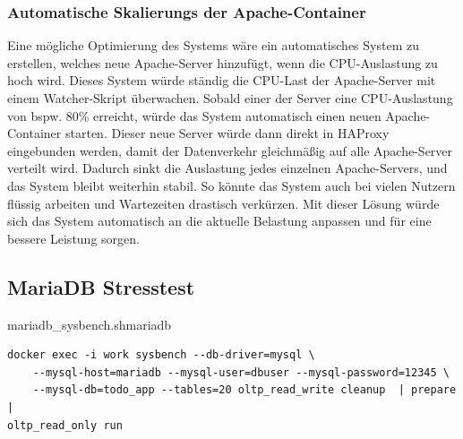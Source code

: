 \subsubsection{Automatische Skalierungs der Apache-Container}

Eine mögliche Optimierung des Systems wäre ein automatisches System zu erstellen, welches neue Apache-Server hinzufügt, wenn die CPU-Auslastung zu hoch wird. Dieses System würde ständig die CPU-Last der Apache-Server mit einem Watcher-Skript überwachen. Sobald einer der Server eine CPU-Auslastung von bspw. 80\% erreicht, würde das System automatisch einen neuen Apache-Container starten. Dieser neue Server würde dann direkt in HAProxy eingebunden werden, damit der Datenverkehr gleichmäßig auf alle Apache-Server verteilt wird. Dadurch sinkt die Auslastung jedes einzelnen Apache-Servers, und das System bleibt weiterhin stabil. So könnte das System auch bei vielen Nutzern flüssig arbeiten und Wartezeiten drastisch verkürzen. Mit dieser Lösung würde sich das System automatisch an die aktuelle Belastung anpassen und für eine bessere Leistung sorgen.


\subsection{MariaDB Stresstest}
\begin{code}{mariadb\_sysbench.sh}{mariadb}
        \begin{verbatim}
docker exec -i work sysbench --db-driver=mysql \
    --mysql-host=mariadb --mysql-user=dbuser --mysql-password=12345 \
    --mysql-db=todo_app --tables=20 oltp_read_write cleanup  | prepare | 
oltp_read_only run
        \end{verbatim}
\end{code}

